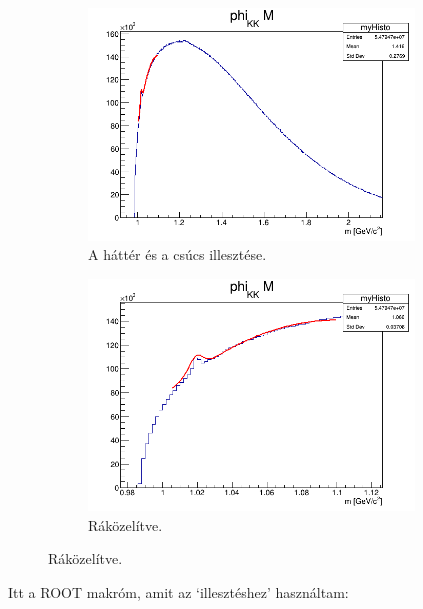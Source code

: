 \documentclass[a4paper,12pt]{article}
\begin{document}
\begin{figure}[H]
	\centering
	\begin{subfigure}{0.49\textwidth}
		\centering
		\includegraphics[width=0.95\textwidth]{phi_KK_Mfit.png}
		\caption{ A háttér és a csúcs illesztése. }
	\end{subfigure}
	\begin{subfigure}{0.49\textwidth}
		\centering
		\includegraphics[width=0.95\textwidth]{phi_KK_Mfitzoom.png}
		\caption{ Ráközelítve. }
	\end{subfigure}
\end{figure}
\par Itt a ROOT makróm, amit az `illesztéshez' használtam:

\end{document}
